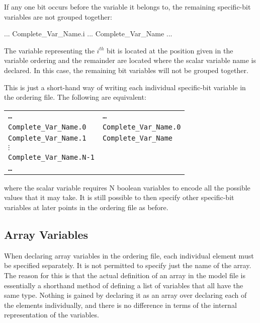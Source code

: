 If any one bit occurs before the variable it belongs to, the remaining
specific-bit variables are not grouped together:
%
\begin{Grammar}
...
Complete\_Var\_Name.i
...
Complete\_Var\_Name
...
\end{Grammar}
%
The variable representing the \textit{$i^{th}$} bit is located at the
position given in the variable ordering and the remainder are located
where the scalar variable name is declared. In this case, the
remaining bit variables will not be grouped together.

\noindent This is just a short-hand way of writing each individual
specific-bit variable in the ordering file. The following are
equivalent:

\begin{small} 
\begin{tabular}{ll} \texttt{\ldots} &
\texttt{\ldots}\\ \texttt{Complete\_Var\_Name.0} &
\texttt{Complete\_Var\_Name.0}\\ \texttt{Complete\_Var\_Name.1} &
\texttt{Complete\_Var\_Name}\\ \texttt{$\vdots$} & \raisebox{1ex}{\texttt{\ldots}}\\
\texttt{Complete\_Var\_Name.N-1}\\ \texttt{\ldots} &
\end{tabular}
\end{small}

\noindent where the scalar variable 
requires N boolean variables to encode all the possible values that it
may take. 
%
It is still possible to then specify other specific-bit variables at
later points in the ordering file as before.\\

\subsection{Array Variables}
\label{Array Variables}

When declaring array variables in the ordering file, each individual
element must be specified separately.
%
It is not permitted to specify just the name of the array.
%
The reason for this is that the actual definition of an array in the
model file is essentially a shorthand method of defining a list of
variables that all have the same type. 
%
Nothing is gained by declaring it as an array over declaring each of
the elements individually, and there is no difference in terms of the
internal representation of the variables.



